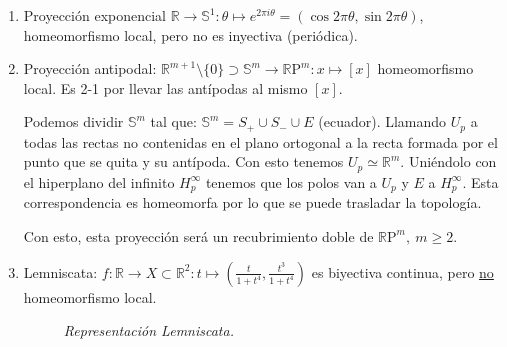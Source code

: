 \begin{demo}
\begin{ej}[¡Importantes!]
\begin{enumerate}
    \item Proyección exponencial $\mathbb{R} \rightarrow \mathbb{S}^1: \theta \mapsto e^{2\pi i\theta} = \left( \cos 2\pi \theta, \sin 2\pi \theta \right)$, homeomorfismo local, pero no es inyectiva (periódica).

    \item Proyección antipodal: $\mathbb{R}^{m+1}\setminus \{0\} \supset \mathbb{S}^m \rightarrow \mathbb{R}\mathrm{P}^{m}: x \mapsto \left[ x \right]$ homeomorfismo local. Es 2-1 por llevar las antípodas al mismo $\left[ x \right]$. 

    Podemos dividir $\mathbb{S}^{m}$ tal que: $\mathbb{S}^{m} = S_{+} \cup S_{-} \cup E$ (ecuador). Llamando $U_p$ a todas las rectas no contenidas en el plano ortogonal a la recta formada por el punto que se quita y su antípoda. Con esto tenemos $U_p \simeq \mathbb{R}^{m}$. Uniéndolo con el hiperplano del infinito $H_p^{\infty}$ tenemos que los polos van a $U_p$ y $E$ a $H_p^{\infty}$. Esta correspondencia es homeomorfa por lo que se puede trasladar la topología.

    Con esto, esta proyección será un recubrimiento doble de $\mathbb{R}\mathrm{P}^m,\ m \ge 2$.

    \item Lemniscata: $f: \mathbb{R} \rightarrow X \subset \mathbb{R}^2: t \mapsto \left( \frac{t}{1 + t^4}, \frac{t^3}{1 + t^4} \right)$ es biyectiva continua, pero \underline{no} homeomorfismo local.

    \begin{figure}[H]
        \centering
        \caption{\textit{Representación Lemniscata.}}
        \label{fig:lemniscata}
    \end{figure}


\end{enumerate}
\end{ej}
\end{demo}
